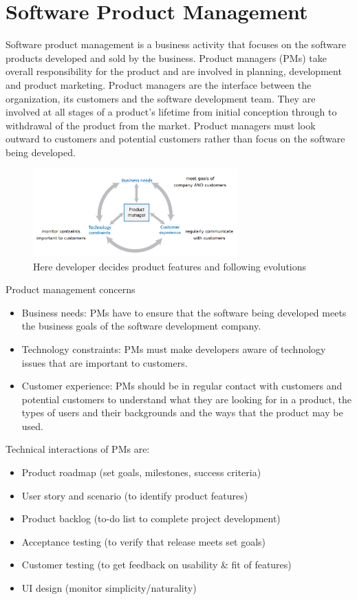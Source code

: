 \documentclass[10pt,a4paper]{report}
\begin{document}
\section{Software Product Management}
Software product management is a business activity that focuses on the
software products developed and sold by the business. Product managers (PMs) take overall responsibility for the product and are involved in planning, development and product marketing.
Product managers are the interface between the organization, its customers and the software development team. They are involved at all stages of a product’s lifetime from initial conception through to withdrawal of the product from the market. Product managers must look outward to customers and potential customers rather than focus on the software being developed.
\begin{figure}[h]
	\centering
	\includegraphics[width=0.7\textwidth]{image06}
	\caption{Here developer decides product features and following evolutions}
	\label{image06}
\end{figure}
Product management concerns
\begin{itemize}
	\item Business needs: PMs have to ensure that the software being developed
	meets the business goals of the software development company.
	\item Technology constraints: PMs must make developers aware of
	technology issues that are important to customers.
	\item Customer experience: PMs should be in regular contact with customers
	and potential customers to understand what they are looking for in a
	product, the types of users and their backgrounds and the ways that the
	product may be used.
	
\end{itemize}

Technical interactions of PMs are:
\begin{itemize}
	\item Product roadmap (set goals, milestones, success criteria)
	\item User story and scenario (to identify product features)
	\item Product backlog (to-do list to complete project development)
	\item Acceptance testing (to verify that release meets set goals)
	\item Customer testing (to get feedback on usability \& fit of features)
	\item UI design (monitor simplicity/naturality)
\end{itemize}
\end{document}
